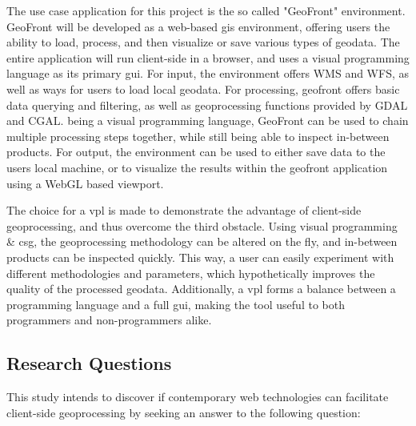 The use case application for this project is the so called "GeoFront" environment. GeoFront will be developed as a web-based \ac{gis} environment, offering users the ability to load, process, and then visualize or save various types of geodata. The entire application will run client-side in a browser, and uses a visual programming language as its primary \ac{gui}.
For input, the environment offers WMS and WFS, as well as ways for users to load local geodata.
For processing, geofront offers basic data querying and filtering, as well as geoprocessing functions provided by GDAL and CGAL. being a visual programming language, GeoFront can be used to chain multiple processing steps together, while still being able to inspect in-between products. 
For output, the environment can be used to either save data to the users local machine, or to visualize the results within the geofront application using a WebGL based viewport.

The choice for a \ac{vpl} is made to demonstrate the advantage of client-side geoprocessing, and thus overcome the third obstacle. Using visual programming \& \ac{csg}, the geoprocessing methodology can be altered on the fly, and in-between products can be inspected quickly. This way, a user can easily experiment with different methodologies and parameters, which hypothetically improves the quality of the processed geodata.
Additionally, a \ac{vpl} forms a balance between a programming language and a full \ac{gui}, making the tool useful to both programmers and non-programmers alike.








\newpage

\subsection{Research Questions}

This study intends to discover if contemporary web technologies can facilitate client-side geoprocessing by seeking an answer to the following question:  


